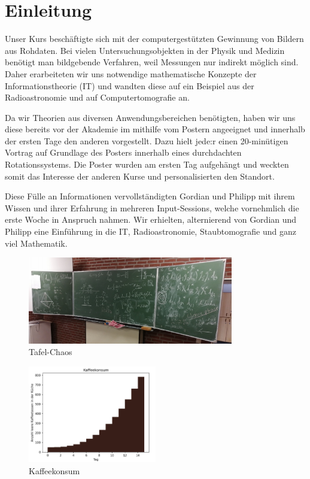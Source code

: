 \section{Einleitung}

Unser Kurs beschäftigte sich mit der computergestützten Gewinnung von Bildern aus Rohdaten. Bei vielen Untersuchungsobjekten in der Physik und Medizin benötigt man bildgebende Verfahren, weil Messungen nur indirekt möglich sind. Daher erarbeiteten wir uns notwendige mathematische Konzepte der Informationstheorie (IT) und wandten diese auf ein Beispiel aus der Radioastronomie und auf Computertomografie an.

Da wir Theorien aus diversen Anwendungsbereichen benötigten, haben wir uns diese bereits vor der Akademie im mithilfe vom Postern angeeignet und innerhalb der ersten Tage den anderen vorgestellt. Dazu hielt jede:r einen 20-minütigen Vortrag auf Grundlage des Posters innerhalb eines durchdachten Rotationssystems. Die Poster wurden am ersten Tag aufgehängt und weckten somit das Interesse der anderen Kurse und personalisierten den Standort.

Diese Fülle an Informationen vervollständigten Gordian und Philipp mit ihrem Wissen und ihrer Erfahrung in mehreren Input-Sessions, welche vornehmlich die erste Woche in Anspruch nahmen. Wir erhielten, alternierend von Gordian und Philipp eine Einführung in die IT, Radioastronomie, Staubtomografie und ganz viel Mathematik.

\begin{figure}[htb]
    \centering
    \includegraphics[width=0.8\textwidth]{k4.2/tafelbild.png}
    \caption{Tafel-Chaos}
\end{figure}

\begin{figure}[htb]
    \centering
	\includegraphics[width=0.5\textwidth]{k4.2/kaffee.png}
	\caption{Kaffeekonsum}
    \label{k4.2.fig.kaffee}
\end{figure}

